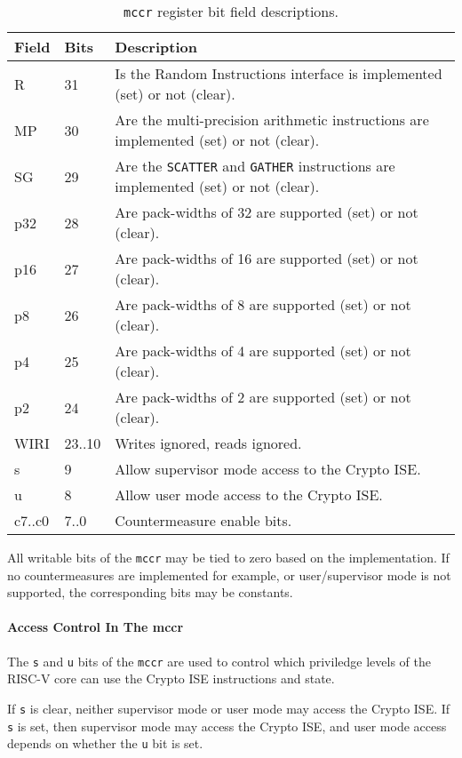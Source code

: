 \begin{table}[t]
\centering
\begin{tabular}{l l l}
\toprule
Field& Bits & Description \\\midrule
R    &31&Is the Random Instructions interface is implemented (set) or not (clear). \\
MP   &30&Are the multi-precision arithmetic instructions are implemented (set) or not (clear). \\
SG   &29&Are the {\tt SCATTER} and {\tt GATHER} instructions are implemented (set) or not (clear). \\
p32  &28&Are pack-widths of 32 are supported (set) or not (clear).\\
p16  &27&Are pack-widths of 16 are supported (set) or not (clear).\\
p8   &26&Are pack-widths of  8 are supported (set) or not (clear).\\
p4   &25&Are pack-widths of  4 are supported (set) or not (clear).\\
p2   &24&Are pack-widths of  2 are supported (set) or not (clear).\\
WIRI & 23..10&Writes ignored, reads ignored. \\
s    & 9 & Allow supervisor mode access to the Crypto ISE. \\
u    & 8 & Allow user mode access to the Crypto ISE. \\
c7..c0 & 7..0 & Countermeasure enable bits. \\
\bottomrule
\end{tabular}
\caption{{\tt mccr} register bit field descriptions.}
\end{table}

All writable bits of the {\tt mccr} may be tied to zero based on the
implementation. If no countermeasures are implemented for example, or
user/supervisor mode is not supported, the corresponding bits may be
constants.

\paragraph{Access Control In The mccr}

The {\tt s} and {\tt u} bits of the {\tt mccr} are used to control which
priviledge levels of the RISC-V core can use the Crypto ISE instructions
and state. 

If {\tt s} is clear, neither supervisor mode or user mode may access the
Crypto ISE. If {\tt s} is set, then supervisor mode may access the Crypto
ISE, and user mode access depends on whether the {\tt u} bit is set.


